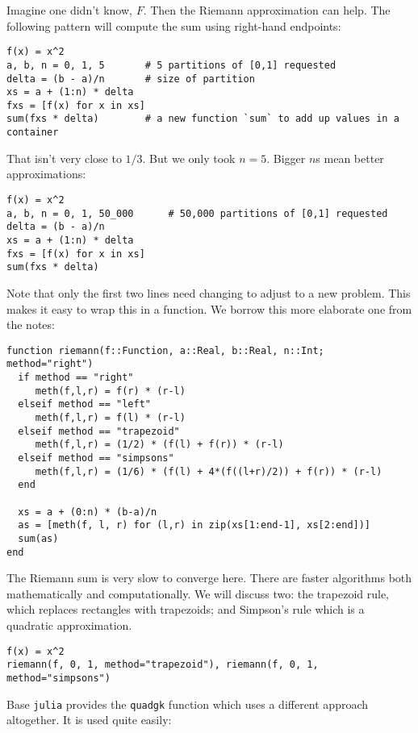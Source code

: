 \documentclass[12pt]{article}
\begin{document}
Imagine one didn't know, $F$. Then the Riemann approximation can help.
The following pattern will compute the sum using right-hand endpoints:



\begin{verbatim}
f(x) = x^2
a, b, n = 0, 1, 5       # 5 partitions of [0,1] requested
delta = (b - a)/n       # size of partition
xs = a + (1:n) * delta  
fxs = [f(x) for x in xs]
sum(fxs * delta)        # a new function `sum` to add up values in a container
\end{verbatim}
That isn't very close to $1/3$. But we only took $n=5$. Bigger $n$s mean
better approximations:



\begin{verbatim}
f(x) = x^2
a, b, n = 0, 1, 50_000      # 50,000 partitions of [0,1] requested
delta = (b - a)/n       
xs = a + (1:n) * delta  
fxs = [f(x) for x in xs]
sum(fxs * delta)
\end{verbatim}
Note that only the first two lines need changing to adjust to a new
problem. This makes it easy to wrap this in a function. We borrow this
more elaborate one from the notes:



\begin{verbatim}
function riemann(f::Function, a::Real, b::Real, n::Int; method="right")
  if method == "right"
     meth(f,l,r) = f(r) * (r-l)
  elseif method == "left"
     meth(f,l,r) = f(l) * (r-l)
  elseif method == "trapezoid"
     meth(f,l,r) = (1/2) * (f(l) + f(r)) * (r-l)
  elseif method == "simpsons"
     meth(f,l,r) = (1/6) * (f(l) + 4*(f((l+r)/2)) + f(r)) * (r-l)
  end

  xs = a + (0:n) * (b-a)/n
  as = [meth(f, l, r) for (l,r) in zip(xs[1:end-1], xs[2:end])]
  sum(as)
end
\end{verbatim}
The Riemann sum is very slow to converge here. There are faster
algorithms both mathematically and computationally. We will discuss two:
the trapezoid rule, which replaces rectangles with trapezoids; and
Simpson's rule which is a quadratic approximation.



\begin{verbatim}
f(x) = x^2
riemann(f, 0, 1, method="trapezoid"), riemann(f, 0, 1, method="simpsons")
\end{verbatim}
Base \texttt{julia} provides the \texttt{quadgk} function which uses a
different approach altogether. It is used quite easily:
\end{document}
